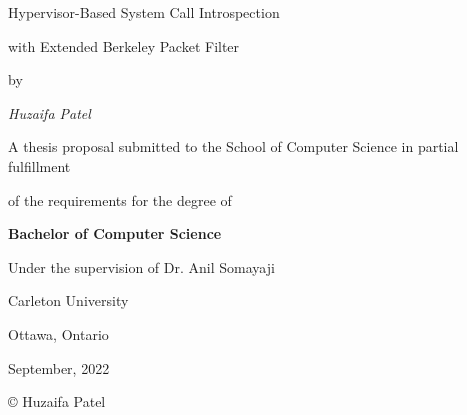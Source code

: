 \documentclass{report}
\begin{document}
\titleformat{\chapter}{}{}{0em}{\bf\LARGE}


\centerline{\Huge Hypervisor-Based System Call Introspection}
\vspace{3mm}
\centerline{\Huge with Extended Berkeley Packet Filter}
\vspace{14mm}
\centerline{\large by}
\vspace{15mm}
\centerline{\itshape \large Huzaifa Patel}
\vspace{2cm}
\centerline{\large A thesis proposal submitted to the School of Computer Science in partial fulfillment}
\vspace{2mm}
\centerline{\large of the requirements for the degree of}
\vspace{2cm}
\centerline{\bf \large Bachelor of Computer Science}
\vspace{3cm}
\centerline{\large Under the supervision of Dr. Anil Somayaji}
\vspace{3mm}
\centerline{\large Carleton University}
\vspace{3mm}
\centerline{\large Ottawa, Ontario}
\vspace{3mm}
\centerline{\large September, 2022}
\vspace{3cm}
\centerline{\large \copyright {} Huzaifa Patel}



\newpage
\pagebreak
\hspace{0pt}
\hspace{0pt}
\pagebreak
\end{document}
